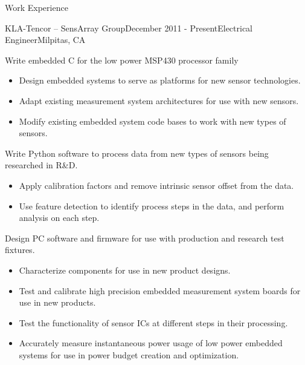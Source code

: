 \documentclass{resume} %
\begin{document}
\begin{rSection}{Work Experience}

\begin{rSubsection}{KLA-Tencor -- SensArray Group}{December 2011 - Present}{Electrical Engineer}{Milpitas, CA}
\smallskip

\item Write embedded C for the low power MSP430 processor family
\begin{itemize}
\itemsep -0.5em \vspace{-0.5em}
\renewcommand{\labelitemi}{-}
\item Design embedded systems to serve as platforms for new sensor technologies.
\item Adapt existing measurement system architectures for use with new sensors.
\item Modify existing embedded system code bases to work with new types of sensors.
\end{itemize}

\item Write Python software to process data from new types of sensors being researched in R\&D.
\begin{itemize}
\itemsep -0.5em \vspace{-0.5em}
\renewcommand{\labelitemi}{-}
\item Apply calibration factors and remove intrinsic sensor offset from the data.
\item Use feature detection to identify process steps in the data, and perform analysis on each step.
\end{itemize}

\item Design PC software and firmware for use with production and research test fixtures.
\begin{itemize}
\itemsep -0.5em \vspace{-0.5em}
\renewcommand{\labelitemi}{-}
\item Characterize components for use in new product designs.
\item Test and calibrate high precision embedded measurement system boards for use in new products.
\item Test the functionality of sensor ICs at different steps in their processing.
\item Accurately measure instantaneous power usage of low power embedded systems for use in power budget creation and optimization.
\end{itemize}


\end{rSubsection}
\end{rSection}
\end{document}
